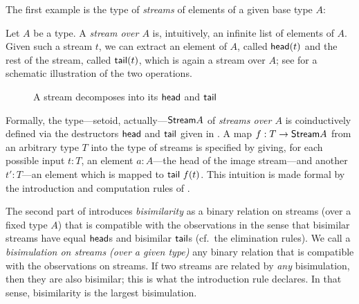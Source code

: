 \documentclass[a4paper,USenglish]{lipics}
\begin{document}
\noindent
The first example is the type of \emph{streams} of elements of a given base type $A$:


\begin{ex}
 \label{ex_stream}
  Let $A$ be a type. A \emph{stream over $A$} is, intuitively, an infinite list of elements of $A$. 
  Given such a stream $t$, we can extract an element of $A$, called $\mathsf{head}(t)$ and the rest of the stream, called $\mathsf{tail}(t)$, which is again a stream over $A$; see  for a schematic illustration of the two operations.
  \begin{figure}[htb]
    \centering
   \caption{A stream decomposes into its $\mathsf{head}$ and $\mathsf{tail}$} \label{fig:stream}
  \end{figure}
  Formally, the type---setoid, actually---$\mathsf{Stream} A$ of \emph{streams over $A$} is coinductively defined via the destructors $\mathsf{head}$ and $\mathsf{tail}$
  given in .  A map $f:T\to \mathsf{Stream} A$ from an arbitrary type $T$ into the type of streams is specified by giving, for each possible input $t:T$, 
  an element $a:A$---the head of the image stream---and another $t':T$---an element which is mapped to $\mathsf{tail}~f(t)$. This intuition is made formal by the 
  introduction and computation rules of .
  
  The second part of  introduces \emph{bisimilarity} as a binary relation on streams (over a fixed type $A$) that is compatible with the observations
  in the sense that bisimilar streams have equal $\mathsf{head}$s and bisimilar $\mathsf{tail}$s (cf.\ the elimination rules). 
  We call a \emph{bisimulation on streams (over a given type)} any binary relation that is compatible with the observations on streams.
  If two streams are related by \emph{any} bisimulation,
  then they are also bisimilar; this is what the introduction rule declares. In that sense, bisimilarity is the largest bisimulation.


\end{ex}
\end{document}
